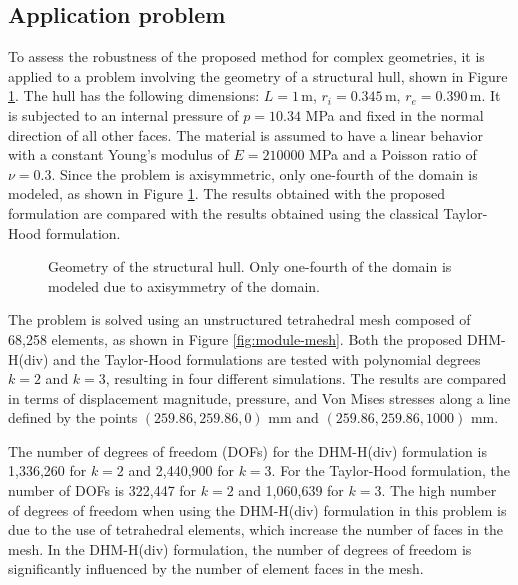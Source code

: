 \documentclass[english,11pt,3p,number,sort&compress]{elsarticle}
\newcommand{\m}{\,\text{m}}
\begin{document}
\subsection{Application problem\label{subsec:module}}

To assess the robustness of the proposed method for complex geometries, it is applied to a problem involving the geometry of a structural hull, shown in Figure \ref{fig:module-geometry}. The hull has the following dimensions: $L=1\m$, $r_i=0.345\m$, $r_e=0.390\m$. It is subjected to an internal pressure of $p=10.34$ MPa and fixed in the normal direction of all other faces. The material is assumed to have a linear behavior with a constant Young's modulus of $E=210000$ MPa and a Poisson ratio of $\nu=0.3$. Since the problem is axisymmetric, only one-fourth of the domain is modeled, as shown in Figure \ref{fig:module-geometry}. The results obtained with the proposed formulation are compared with the results obtained using the classical Taylor-Hood formulation.

\begin{figure}[h]
    \centering
    \def\svgwidth{450pt} 
    
    \caption{Geometry of the structural hull. Only one-fourth of the domain is modeled due to axisymmetry of the domain.}
    \label{fig:module-geometry}
\end{figure}

The problem is solved using an unstructured tetrahedral mesh composed of 68,258 elements, as shown in Figure \ref{fig:module-mesh}. Both the proposed DHM-H(div) and the Taylor-Hood formulations are tested with polynomial degrees $k=2$ and $k=3$, resulting in four different simulations. The results are compared in terms of displacement magnitude, pressure, and Von Mises stresses along a line defined by the points $(259.86, 259.86, 0)$ mm and $(259.86, 259.86, 1000)$ mm. 

The number of degrees of freedom (DOFs) for the DHM-H(div) formulation is 1,336,260 for $k=2$ and 2,440,900 for $k=3$. For the Taylor-Hood formulation, the number of DOFs is 322,447 for $k=2$ and 1,060,639 for $k=3$. The high number of degrees of freedom when using the DHM-H(div) formulation in this problem is due to the use of tetrahedral elements, which increase the number of faces in the mesh. In the DHM-H(div) formulation, the number of degrees of freedom is significantly influenced by the number of element faces in the mesh.
\end{document}
